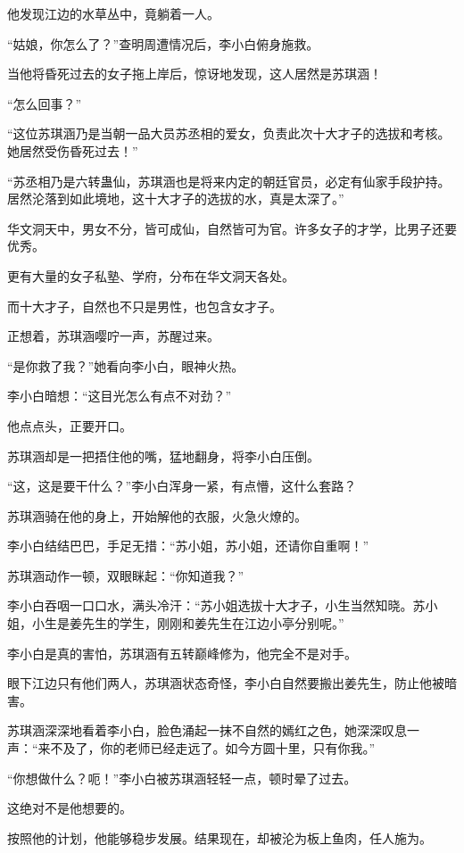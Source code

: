 \begin{this_body}
他发现江边的水草丛中，竟躺着一人。

“姑娘，你怎么了？”查明周遭情况后，李小白俯身施救。

当他将昏死过去的女子拖上岸后，惊讶地发现，这人居然是苏琪涵！

“怎么回事？”

“这位苏琪涵乃是当朝一品大员苏丞相的爱女，负责此次十大才子的选拔和考核。她居然受伤昏死过去！”

“苏丞相乃是六转蛊仙，苏琪涵也是将来内定的朝廷官员，必定有仙家手段护持。居然沦落到如此境地，这十大才子的选拔的水，真是太深了。”

华文洞天中，男女不分，皆可成仙，自然皆可为官。许多女子的才学，比男子还要优秀。

更有大量的女子私塾、学府，分布在华文洞天各处。

而十大才子，自然也不只是男性，也包含女才子。

正想着，苏琪涵嘤咛一声，苏醒过来。

“是你救了我？”她看向李小白，眼神火热。

李小白暗想：“这目光怎么有点不对劲？”

他点点头，正要开口。

苏琪涵却是一把捂住他的嘴，猛地翻身，将李小白压倒。

“这，这是要干什么？”李小白浑身一紧，有点懵，这什么套路？

苏琪涵骑在他的身上，开始解他的衣服，火急火燎的。

李小白结结巴巴，手足无措：“苏小姐，苏小姐，还请你自重啊！”

苏琪涵动作一顿，双眼眯起：“你知道我？”

李小白吞咽一口口水，满头冷汗：“苏小姐选拔十大才子，小生当然知晓。苏小姐，小生是姜先生的学生，刚刚和姜先生在江边小亭分别呢。”

李小白是真的害怕，苏琪涵有五转巅峰修为，他完全不是对手。

眼下江边只有他们两人，苏琪涵状态奇怪，李小白自然要搬出姜先生，防止他被暗害。

苏琪涵深深地看着李小白，脸色涌起一抹不自然的嫣红之色，她深深叹息一声：“来不及了，你的老师已经走远了。如今方圆十里，只有你我。”

“你想做什么？呃！”李小白被苏琪涵轻轻一点，顿时晕了过去。

这绝对不是他想要的。

按照他的计划，他能够稳步发展。结果现在，却被沦为板上鱼肉，任人施为。


\end{this_body}
